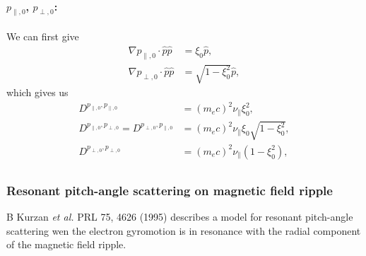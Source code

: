 \documentclass[11pt,a4paper]{article}
\begin{document}
\paragraph{$p_{\parallel,0}$, $p_{\perp,0}$:}
We can first give
\begin{align}
\nabla p_{\parallel,0} \cdot \hat{p}\hat{p} &= \xi_0 \hat{p} , \nonumber \\
\nabla p_{\perp,0} \cdot \hat{p}\hat{p} &= \sqrt{1-\xi_0^2}\hat{p},
\end{align}
which gives us
\begin{align}
D^{p_{\parallel,0},p_{\parallel,0}} &= (m_e c)^2 \nu_\parallel \xi_0^2, \nonumber \\
D^{p_{\parallel,0},p_{\perp,0}} = D^{p_{\perp,0},p_{\parallel,0}} &= (m_e c)^2 \nu_\parallel \xi_0\sqrt{1-\xi_0^2}, \nonumber \\
D^{p_{\perp,0},p_{\perp,0}} &= (m_e c)^2 \nu_\parallel(1- \xi_0^2), \nonumber \\
\end{align}


\subsubsection*{Resonant pitch-angle scattering on magnetic field ripple}
B Kurzan \emph{et al.} PRL 75, 4626 (1995) describes a model for resonant pitch-angle scattering wen the electron gyromotion is in resonance with the radial component of the magnetic field ripple. 
\end{document}

